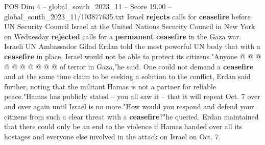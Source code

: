 \begin{textsample}{POS Dim 4 – global\_south\_2023\_11 – Score 19.00 – global\_south\_2023\_11/103877635.txt}
Israel \textbf{rejects} calls for \textbf{ceasefire} before UN Security Council Israel at the United Nations Security Council in New York on Wednesday \textbf{rejected} calls for a \textbf{permanent} \textbf{ceasefire} in the Gaza war.
Israeli UN Ambassador Gilad Erdan told the most powerful UN body that with a \textbf{ceasefire} in place, Israel would not be able to protect its citizens."Anyone @ @ @ @ @ @ @ @ @ @ of terror in Gaza,"he said.
One could not demand a \textbf{ceasefire} and at the same time claim to be seeking a solution to the conflict, Erdan said further, noting that the militant Hamas is not a partner for reliable peace."Hamas has publicly stated -- you all saw it -- that it will repeat Oct. 7 over and over again until Israel is no more."How would you respond and defend your citizens from such a clear threat with a \textbf{ceasefire}?"he queried.
Erdan maintained that there could only be an end to the violence if Hamas handed over all its hostages and everyone else involved in the attack on Israel on Oct. 7.

\end{textsample}
